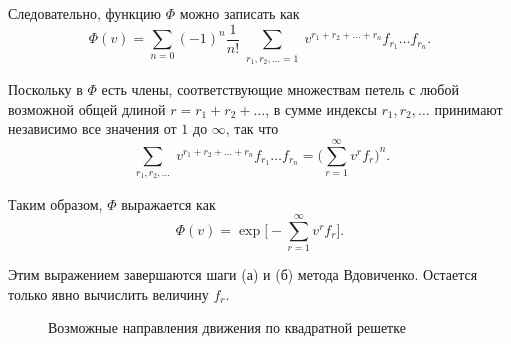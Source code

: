 Следовательно, функцию $\Phi$ можно записать как
\begin{equation}
\Phi(v) = \sum_{n = 0} (-1)^n \frac{1}{n!} \sum_{\substack{r_1, r_2, \dots = 1}} v^{r_1 + r_2 + \dots + r_n} f_{r_1} \dots f_{r_n}.
\end{equation}

Поскольку в $\Phi$ есть члены, соответствующие множествам петель с любой возможной общей длиной $r = r_1 + r_2 + \dots$, в сумме  индексы $r_1, r_2, \dots$ принимают независимо все значения от $1$ до $\infty$, так что
\begin{equation*}
\sum_{\substack{r_1, r_2, \dots}} v^{r_1 + r_2 + \dots + r_n} f_{r_1} \dots f_{r_n} = \bigg(\sum_{r=1}^{\infty}v^r f_{r}\bigg)^n.
\end{equation*}

Таким образом, $\Phi$ выражается как
\begin{equation}
\Phi (v) = \exp{\bigg[-\sum_{r=1}^{\infty}v^r f_{r}\bigg]}.
\label{Phi}
\end{equation}

Этим выражением завершаются шаги (а) и (б) метода Вдовиченко.
Остается только явно вычислить величину $f_{r}$.

 \begin{figure}[h]
 	\caption{Возможные направления движения по квадратной решетке}
 	\label{dirSquare}
 \end{figure}

